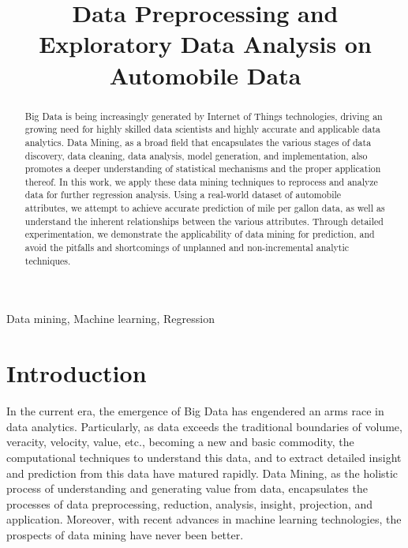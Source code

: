 \documentclass[10pt, conference, compsocconf]{IEEEtran}
\begin{document}
\title{Data Preprocessing and Exploratory Data Analysis on Automobile Data}

\newcommand{\superast}{\raisebox{9pt}{$\ast$}}
\newcommand{\superdagger}{\raisebox{9pt}{$\dagger$}}
\newcommand{\superddagger}{\raisebox{9pt}{$\ddagger$}}
\newcommand{\superS}{\raisebox{9pt}{$\S$}}
\newcommand{\superP}{\raisebox{9pt}{$\P$}}

\author{
}

\maketitle

\begin{abstract}
Big Data is being increasingly generated by Internet of Things technologies, driving an growing need for highly skilled data scientists and highly accurate and applicable data analytics. Data Mining, as a broad field that encapsulates the various stages of data discovery, data cleaning, data analysis, model generation, and implementation, also promotes a deeper understanding of statistical mechanisms and the proper application thereof. In this work, we apply these data mining techniques to reprocess and analyze data for further regression analysis. Using a real-world dataset of automobile attributes, we attempt to achieve accurate prediction of mile per gallon data, as well as understand the inherent relationships between the various attributes. Through detailed experimentation, we demonstrate the applicability of data mining for prediction, and avoid the pitfalls and shortcomings of unplanned and non-incremental analytic techniques. 

\end{abstract}

\begin{IEEEkeywords}
Data mining, Machine learning, Regression
\end{IEEEkeywords}

\section{Introduction}\label{intro}

In the current era, the emergence of Big Data has engendered an arms race in data analytics. Particularly, as data exceeds the traditional boundaries of volume, veracity, velocity, value, etc., becoming a new and basic commodity, the computational techniques to understand this data, and to extract detailed insight and prediction from this data have matured rapidly. Data Mining, as the holistic process of understanding and generating value from data, encapsulates the processes of data preprocessing, reduction, analysis, insight, projection, and application. Moreover, with recent advances in machine learning technologies, the prospects of data mining have never been better. 
\end{document}
